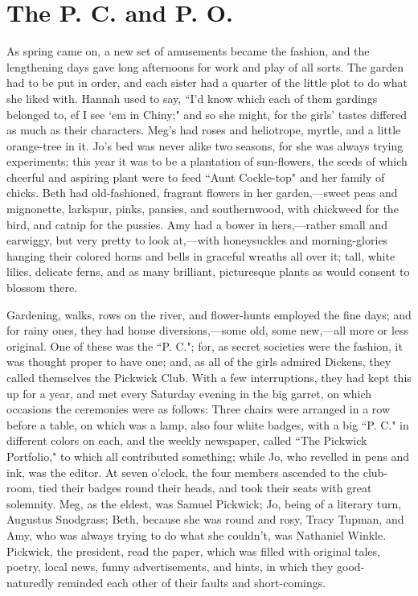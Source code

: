 \chapter{The P. C. and P. O.}

{As} spring came on, a new set of amusements became the fashion, and the
lengthening days gave long afternoons for work and play of all sorts.
The garden had to be put in order, and each sister had a quarter of the
little plot to do what she liked with. Hannah used to say,
``I'd know which each of them gardings belonged to, ef I
see `em in Chiny;" and so she might, for the
girls' tastes differed as much as their characters.
Meg's had roses and heliotrope, myrtle, and a little
orange-tree in it. Jo's bed was never alike two seasons,
for she was always trying experiments; this year it was to be a
plantation of sun-flowers, the seeds of which cheerful and aspiring
plant were to feed ``Aunt Cockle-top" and her family of chicks. Beth had
old-fashioned, fragrant flowers in her garden,---sweet peas and
mignonette, larkspur, pinks, pansies, and southernwood, with chickweed
for the bird, and catnip for the pussies. Amy had a bower in
hers,---rather small and earwiggy, but very pretty to look at,---with
honeysuckles and morning-glories hanging their colored horns and bells
in graceful wreaths all over it; tall, white lilies, delicate ferns, and
as many brilliant, picturesque plants as would consent to blossom there.

Gardening, walks, rows on the river, and flower-hunts employed the fine
days; and for rainy ones, they had house diversions,---some old, some
new,---all more or less original. One of these was the ``P. C."; for, as
secret societies were the fashion, it was thought proper to have one;
and, as all of the girls admired Dickens, they called themselves the
Pickwick Club. With a few interruptions, they had kept this up for a
year, and met every Saturday evening in the big garret, on which
occasions the ceremonies were as follows: Three chairs were arranged in
a row before a table, on which was a lamp, also four white badges, with
a big ``P. C." in different colors on each, and the weekly newspaper,
called ``The Pickwick Portfolio," to which all contributed something;
while Jo, who revelled in pens and ink, was the editor. At seven
o'clock, the four members ascended to the club-room,
tied their badges round their heads, and took their seats with great
solemnity. Meg, as the eldest, was Samuel Pickwick; Jo, being of a
literary turn, Augustus Snodgrass; Beth, because she was round and rosy,
Tracy Tupman, and Amy, who was always trying to do what she
couldn't, was Nathaniel Winkle. Pickwick, the president,
read the paper, which was filled with original tales, poetry, local
news, funny advertisements, and hints, in which they good-naturedly
reminded each other of their faults and short-comings.

